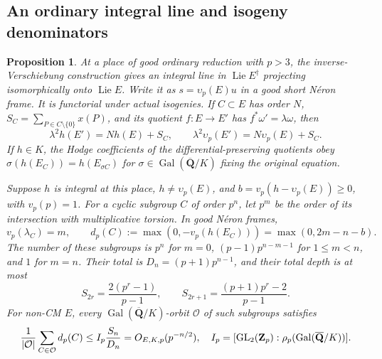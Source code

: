 \documentclass[11pt]{article}
\newtheorem{proposition}[theorem]{Proposition}
\theoremstyle{definition}\newtheorem{definition}[theorem]{Definition}
\theoremstyle{remark}\newtheorem{remark}[theorem]{Remark}
\newcommand{\Qb}{\overline{\mathbf Q}}\newcommand{\Fp}{\mathbf F_p}
\DeclareMathOperator{\Lie}{Lie}\DeclareMathOperator{\trdeg}{trdeg}
\DeclareMathOperator{\Gal}{Gal}\DeclareMathOperator{\im}{im}
\begin{document}
\subsection{An ordinary integral line and isogeny denominators}
\begin{proposition}\label{prop:isogeny-ordinary-orbits}
At a place of good ordinary reduction with $p>3$, the inverse-Verschiebung construction gives an integral line in $\Lie E^\dagger$ projecting isomorphically onto $\Lie E$. Write it as $s=\upsilon_p(E)u$ in a good short N\'eron frame. It is functorial under actual isogenies. If $C\subset E$ has order $N$, $S_C=\sum_{P\in C\setminus\{0\}}x(P)$, and its quotient $f:E\to E'$ has $f^*\omega'=\lambda\omega$, then
\[
 \lambda^2h(E')=Nh(E)+S_C,
 \qquad\lambda^2\upsilon_p(E')=N\upsilon_p(E)+S_C.          \tag{1}
\]
If $h\in K$, the Hodge coefficients of the differential-preserving quotients obey
$\sigma(h(E_C))=h(E_{\sigma C})$ for $\sigma\in\Gal(\Qb/K)$ fixing the original equation.

Suppose $h$ is integral at this place, $h\ne\upsilon_p(E)$, and
$b=v_p(h-\upsilon_p(E))\ge0$, with $v_p(p)=1$. For a cyclic subgroup $C$ of order $p^n$, let $p^m$ be the order of its intersection with multiplicative torsion. In good N\'eron frames,
\[
 v_p(\lambda_C)=m,
 \qquad d_p(C):=\max(0,-v_p(h(E_C)))=\max(0,2m-n-b).       \tag{2}
\]
The number of these subgroups is $p^n$ for $m=0$, $(p-1)p^{n-m-1}$ for $1\le m<n$, and $1$ for $m=n$. Their total is $D_n=(p+1)p^{n-1}$, and their total depth is at most
\[
 S_{2r}=\frac{2(p^r-1)}{p-1},\qquad
 S_{2r+1}=\frac{(p+1)p^r-2}{p-1}.
\]
For non-CM $E$, every $\Gal(\Qb/K)$-orbit $\mathcal O$ of such subgroups satisfies
\[
 \frac1{|\mathcal O|}\sum_{C\in\mathcal O}d_p(C)
       \le I_p\frac{S_n}{D_n}=O_{E,K,p}(p^{-n/2}),
 \quad I_p=[\GL_2(\Z_p):\rho_p(\Gal(\Qb/K))].
\]
\end{proposition}
\end{document}

